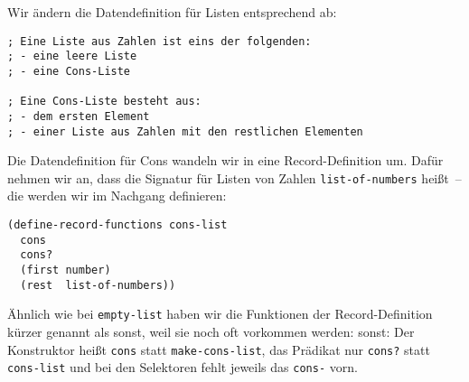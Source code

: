 Wir ändern die Datendefinition für Listen entsprechend ab:
%
\begin{lstlisting}
; Eine Liste aus Zahlen ist eins der folgenden:
; - eine leere Liste
; - eine Cons-Liste

; Eine Cons-Liste besteht aus:
; - dem ersten Element
; - einer Liste aus Zahlen mit den restlichen Elementen
\end{lstlisting}
%
Die Datendefinition für Cons wandeln wir in eine Record-Definition um.
Dafür nehmen wir an, dass die Signatur für Listen von Zahlen
\lstinline{list-of-numbers} heißt~-- die werden wir im Nachgang
definieren:
%
\begin{lstlisting}
(define-record-functions cons-list
  cons
  cons?
  (first number)
  (rest  list-of-numbers))
\end{lstlisting}
%
Ähnlich wie bei \lstinline{empty-list} haben wir die Funktionen der
Record-Definition kürzer genannt als sonst, weil sie noch oft
vorkommen werden:
sonst:\label{def:cons}
Der Konstruktor heißt \lstinline{cons} statt
\lstinline{make-cons-list}, das Prädikat nur \lstinline{cons?}  statt
\lstinline{cons-list} und bei den Selektoren fehlt jeweils das
\lstinline{cons-} vorn.

